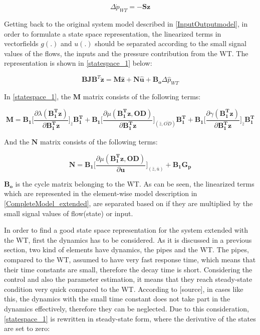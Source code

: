 \begin{equation}
\Delta \dot{p}_{WT} = - \pmb{S} \pmb{z}
 \label{currentlaw_4}
\end{equation}

Getting back to the original system model described in \eqref{InputOutputmodel}, in order to formulate a state space representation, the linearized terms in  vectorfields $g(.)$ and $u(.)$ should be separated according to the small signal values of the flows, the inputs and the pressure contribution from the WT. The representation is shown in \eqref{statespace_1} below: 

\begin{equation}
 \pmb{B}\pmb{J {B}}^T \pmb{\dot{z}} = \pmb{M} \pmb{\hat{z}} + \pmb{N} \pmb{\hat{u}} + \pmb{B_o} \Delta \hat{p}_{WT}    
 \label{statespace_1}
\end{equation}

In \eqref{statespace_1}, the $\pmb{M}$ matrix consists of the following terms: 

\begin{equation}
  \pmb{M} = \pmb{B_1} \bigg[ \frac{\partial{\lambda(\pmb{{B_1^{T}}}\pmb{z})}}{{\partial{\pmb{{B_1^{T}}}\pmb{z}}}}   \bigg]_{\bar{z}} \pmb{{B_1^{T}}} +  \pmb{B_1} \bigg[ \frac{\partial{\mu(\pmb{{B_1^{T}}}\pmb{z}, \pmb{OD})}}{{\partial{\pmb{{B_1^{T}}}\pmb{z}}}}  \bigg]_{(\bar{z}, \bar{OD})} \pmb{{B_1^{T}}} +  \pmb{B_1} \bigg[ \frac{\partial{\gamma(\pmb{{B_1^{T}}}\pmb{z})}}{{\partial{\pmb{{B_1^{T}}}\pmb{z}}}}   \bigg]_{\bar{z}} \pmb{{B_1^{T}}}
\label{Amatrix}
\end{equation}

And the $\pmb{N}$ matrix consists of the following terms:

\begin{equation}
  \pmb{N} = \pmb{B_1} \bigg[ \frac{\partial{\mu(\pmb{{B_1^{T}}}\pmb{z}, \pmb{OD})}}{{\partial{\pmb{u}}}}  \bigg]_{(\bar{z}, \bar{u})} + \pmb{B_1}\pmb{G_p}  
\label{Bumatrix}
\end{equation}

$\pmb{B_o}$ is the cycle matrix belonging to the WT. As can be seen, the linearized terms which are represented in the element-wise model description in \eqref{CompleteModel_extended}, are separated based on if they are multiplied by the small signal values of flow(state) or input. 

In order to find a good state space representation for the system extended with the WT, first the dynamics has to be considered. As it is discussed in a previous section, two kind of elements have dynamics, the pipes and the WT. The pipes, compared to the WT, assumed to have very fast response time, which means that their time constants are small, therefore the decay time is short. Considering the control and also the parameter estimation, it means that they reach steady-state condition very quick compared to the WT. According to [source], in cases like this, the dynamics with the small time constant does not take part in the dynamics effectively, therefore they can be neglected. Due to this consideration, \eqref{statespace_1} is rewritten in steady-state form, where the derivative of the states are set to zero:

